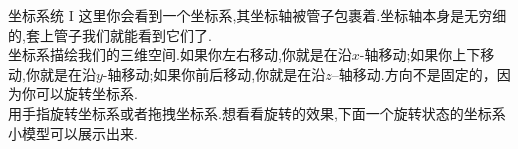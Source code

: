 ﻿\begin{surferPage}[Coordinates I]{坐标系统 I}
这里你会看到一个坐标系,其坐标轴被管子包裹着.坐标轴本身是无穷细的,套上管子我们就能看到它们了.\\
坐标系描绘我们的三维空间.如果你左右移动,你就是在沿$x$-轴移动;如果你上下移动,你就是在沿$y$-轴移动;如果你前后移动,你就是在沿$z$--轴移动.方向不是固定的，因为你可以旋转坐标系.\\
\vspace{0.3cm}
用手指旋转坐标系或者拖拽坐标系.想看看旋转的效果,下面一个旋转状态的坐标系小模型可以展示出来.
\end{surferPage}


